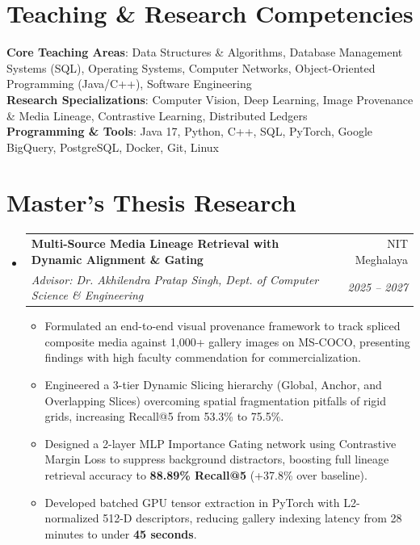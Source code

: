 \documentclass[letterpaper,10pt]{article}
\makeatletter
\newcommand{\resumeItem}[1]{
  \item\small{
    {#1 \vspace{-2pt}}
  }
}
\newcommand{\resumeSubheading}[4]{
  \vspace{-2pt}\item
    \begin{tabular*}{0.97\textwidth}[t]{l@{\extracolsep{\fill}}r}
      \textbf{#1} & #2 \\
      \textit{\small#3} & \textit{\small #4} \\
    \end{tabular*}\vspace{-5pt}
}
\newcommand{\resumeSubHeadingListStart}{\begin{itemize}[leftmargin=0.15in, label={}]}
\newcommand{\resumeSubHeadingListEnd}{\end{itemize}}
\newcommand{\resumeItemListStart}{\begin{itemize}[leftmargin=0.15in]}
\newcommand{\resumeItemListEnd}{\end{itemize}\vspace{-4pt}}
\makeatother
\begin{document}
\section{Teaching \& Research Competencies}
 \begin{itemize}[leftmargin=0.15in, label={}]
    \small{\item{
     \textbf{Core Teaching Areas}{: Data Structures \& Algorithms, Database Management Systems (SQL), Operating Systems, Computer Networks, Object-Oriented Programming (Java/C++), Software Engineering} \\
     \textbf{Research Specializations}{: Computer Vision, Deep Learning, Image Provenance \& Media Lineage, Contrastive Learning, Distributed Ledgers} \\
     \textbf{Programming \& Tools}{: Java 17, Python, C++, SQL, PyTorch, Google BigQuery, PostgreSQL, Docker, Git, Linux}
    }}
 \end{itemize}

\section{Master's Thesis Research}
  \resumeSubHeadingListStart
    \resumeSubheading
      {Multi-Source Media Lineage Retrieval with Dynamic Alignment \& Gating}{NIT Meghalaya}
      {Advisor: Dr. Akhilendra Pratap Singh, Dept. of Computer Science \& Engineering}{2025 -- 2027}
      \resumeItemListStart
        \resumeItem{Formulated an end-to-end visual provenance framework to track spliced composite media against 1,000+ gallery images on MS-COCO, presenting findings with high faculty commendation for commercialization.}
        \resumeItem{Engineered a 3-tier Dynamic Slicing hierarchy (Global, Anchor, and Overlapping Slices) overcoming spatial fragmentation pitfalls of rigid grids, increasing Recall@5 from 53.3\% to 75.5\%.}
        \resumeItem{Designed a 2-layer MLP Importance Gating network using Contrastive Margin Loss to suppress background distractors, boosting full lineage retrieval accuracy to \textbf{88.89\% Recall@5} (+37.8\% over baseline).}
        \resumeItem{Developed batched GPU tensor extraction in PyTorch with L2-normalized 512-D descriptors, reducing gallery indexing latency from 28 minutes to under \textbf{45 seconds}.}
      \resumeItemListEnd
  \resumeSubHeadingListEnd

\end{document}
